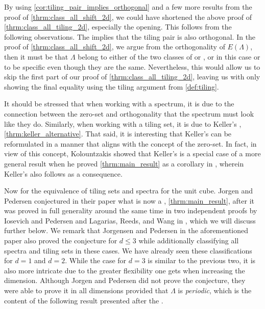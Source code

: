 \documentclass[../thesis.tex]{subfiles}
\begin{document}
\begin{remark}
    By using \cref{cor:tiling_pair_implies_orthogonal} and a few more results from the proof of \cref{thrm:class_all_shift_2d}, we could have shortened the above proof of \cref{thrm:class_all_tiling_2d}, especially the opening. This follows from the following observations. The  implies that the tiling pair is also orthogonal. In the proof of \cref{thrm:class_all_shift_2d}, we argue from the orthogonality of $E(\Lambda)$, then it must be that $\Lambda$ belong to either of the two classes of  or , or in this case  or  to be specific even though they are the same. Nevertheless, this would allow us to skip the first part of our proof of \cref{thrm:class_all_tiling_2d}, leaving us with only showing the final equality using the tiling argument from \cref{def:tiling}.
\end{remark}

It should be stressed that when working with a spectrum, it is due to the connection between the zero-set and orthogonality that the spectrum must look like they do. Similarly, when working with a tiling set, it is due to Keller's , \cref{thrm:keller_alternative}. That said, it is interesting that Keller's  can be reformulated in a manner that aligns with the concept of the zero-set. In fact, in view of this concept, Kolountzakis showed that Keller's  is a special case of a more general result when he proved \cref{thrm:main_result} as a corollary in \cite{kolountzakisPackingTilingOrthogonality2000}, wherein Keller's  also follows as a consequence.

Now for the equivalence of tiling sets and spectra for the unit cube. Jorgen and Pedersen conjectured in their paper \cite{jorgensenSpectralPairsCartesian2001} what is now a , \cref{thrm:main_result}, after it was proved in full generality around the same time in two independent proofs by Iosevich and Pedersen \cite{iosevichSpectralTilingProperties1998} and Lagarias, Reeds, and Wang in \cite{lagariasOrthonormalBasesExponentials2000}, which we will discuss further below. We remark that Jorgensen and Pedersen in the aforementioned paper \cite{jorgensenSpectralPairsCartesian2001} also proved the conjecture for $d\leq3$ while additionally classifying all spectra and tiling sets in these cases. We have already seen these classifications for $d=1$ and $d=2$. While the case for $d=3$ is similar to the previous two, it is also more intricate due to the greater flexibility one gets when increasing the dimension. Although Jorgen and Pedersen did not prove the conjecture, they were able to prove it in all dimensions provided that $\Lambda$ is \emph{periodic}, which is the content of the following result presented after the .
\end{document}
